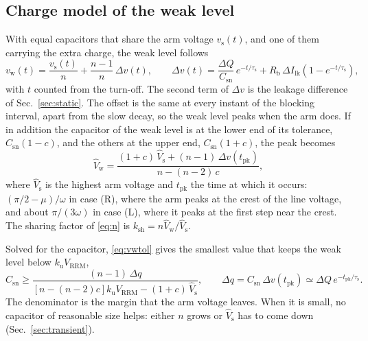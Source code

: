 \documentclass[10pt,a4paper]{scrartcl}
\newcommand{\Vrrm}{V_\mathrm{RRM}}
\newcommand{\Csn}{C_\mathrm{sn}}
\newcommand{\Rb}{R_\mathrm{b}}
\newcommand{\Vs}{\hat V_\mathrm{s}}
\newcommand{\Vw}{\hat V_\mathrm{w}}
\newcommand{\taus}{\tau_\mathrm{s}}
\newcommand{\Ilk}{I_\mathrm{lk}}
\newcommand{\ku}{k_\mathrm{u}}
\newcommand{\ksh}{k_\mathrm{sh}}
\newcommand{\caseR}{(R)}
\newcommand{\caseL}{(L)}
\begin{document}
\subsection{Charge model of the weak level}
With equal capacitors that share the arm voltage $v_\mathrm{s}(t)$, and one of them carrying the extra charge, the weak level follows
\begin{equation}
v_\mathrm{w}(t) = \frac{v_\mathrm{s}(t)}{n} + \frac{n-1}{n}\,\Delta v(t), \qquad
\Delta v(t) = \frac{\Delta Q}{\Csn}\,e^{-t/\taus} + \Rb\,\Delta\Ilk\left(1 - e^{-t/\taus}\right),
\label{eq:vw}
\end{equation}
with $t$ counted from the turn-off. The second term of $\Delta v$ is the leakage difference of Sec.~\ref{sec:static}. The offset is the same at every instant of the blocking interval, apart from the slow decay, so the weak level peaks when the arm does. If in addition the capacitor of the weak level is at the lower end of its tolerance, $\Csn(1-c)$, and the others at the upper end, $\Csn(1+c)$, the peak becomes
\begin{equation}
\Vw = \frac{(1+c)\,\Vs + (n-1)\,\Delta v(t_\mathrm{pk})}{n - (n-2)\,c} ,
\label{eq:vwtol}
\end{equation}
where $\Vs$ is the highest arm voltage and $t_\mathrm{pk}$ the time at which it occurs: $(\pi/2 - \mu)/\omega$ in case \caseR{}, where the arm peaks at the crest of the line voltage, and about $\pi/(3\omega)$ in case \caseL{}, where it peaks at the first step near the crest. The sharing factor of \eqref{eq:n} is $\ksh = n\Vw/\Vs$.

Solved for the capacitor, \eqref{eq:vwtol} gives the smallest value that keeps the weak level below $\ku\Vrrm$,
\begin{equation}
\Csn \ge \frac{(n-1)\,\Delta q}{\left[n - (n-2)c\right]\ku\Vrrm - (1+c)\,\Vs}, \qquad \Delta q = \Csn\,\Delta v(t_\mathrm{pk}) \simeq \Delta Q\,e^{-t_\mathrm{pk}/\taus} .
\label{eq:csn}
\end{equation}
The denominator is the margin that the arm voltage leaves. When it is small, no capacitor of reasonable size helps: either $n$ grows or $\Vs$ has to come down (Sec.~\ref{sec:transient}).
\end{document}

